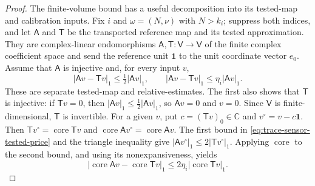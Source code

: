 \begin{proof}
The finite-volume bound has a useful decomposition into its tested-map and
calibration inputs. Fix $i$ and $\omega=(N,\nu)$ with $N>k_i$; suppress both
indices, and let $\mathsf A$ and $\mathsf T$ be the transported reference
map and its tested approximation. They are complex-linear endomorphisms $\mathsf A,\mathsf T:\mathsf V\to\mathsf V$ of the finite
complex coefficient space and send the reference unit $\mathbf1$ to the
unit coordinate vector $e_0$. Assume that $\mathsf A$ is injective and, for
every input $v$,
\begin{equation}
 |\mathsf A v-\mathsf T v|_1\le\tfrac12|\mathsf A v|_1,
 \qquad
 |\mathsf A v-\mathsf T v|_1\le\eta_i|\mathsf A v|_1.
 \label{eq:trace-sensor-tested-price}
\end{equation}
These are separate tested-map and relative-estimates. The first also
shows that $\mathsf T$ is injective: if $\mathsf T v=0$, then
$|\mathsf A v|_1\le\tfrac12|\mathsf A v|_1$, so $\mathsf A v=0$
and $v=0$. Since $\mathsf V$ is finite-dimensional, $\mathsf T$ is invertible. For a given $v$, put
$c=(\mathsf T v)_0\in\mathbb C$ and $v^\circ=v-c\mathbf1$. Then
$\mathsf T v^\circ=\operatorname{core}\mathsf T v$ and
$\operatorname{core}\mathsf A v^\circ=\operatorname{core}\mathsf A v$. The first bound in
\eqref{eq:trace-sensor-tested-price} and the triangle inequality give
$|\mathsf A v^\circ|_1\le2|\mathsf T v^\circ|_1$. Applying $\operatorname{core}$ to
the second bound, and using its nonexpansiveness, yields
\begin{equation}
 |\operatorname{core}\mathsf A v-\operatorname{core}\mathsf T v|_1
 \le2\eta_i|\operatorname{core}\mathsf T v|_1.
 \label{eq:trace-sensor-centered-price}
\end{equation}


\end{proof}
